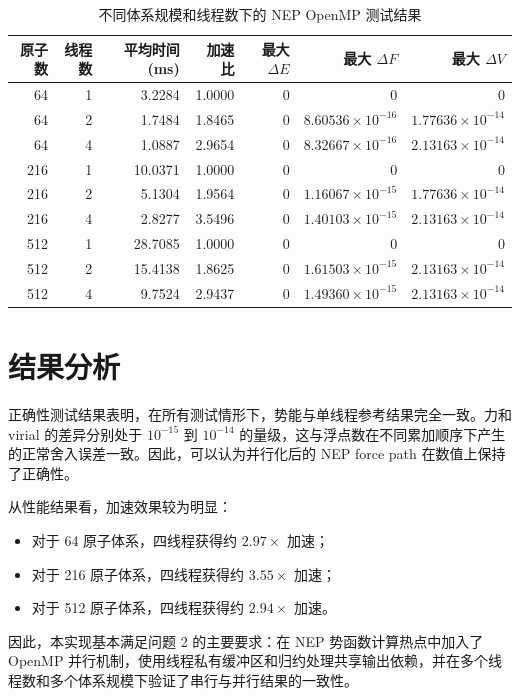 \documentclass[11pt]{article}
\begin{document}
\begin{table}[h]
\centering
\begin{tabular}{@{}rrrrrrr@{}}
\toprule
原子数 & 线程数 & 平均时间 (ms) & 加速比 & 最大 $\Delta E$ & 最大 $\Delta F$ & 最大 $\Delta V$ \\
\midrule
64  & 1 & 3.2284  & 1.0000 & 0 & 0 & 0 \\
64  & 2 & 1.7484  & 1.8465 & 0 & $8.60536\times10^{-16}$ & $1.77636\times10^{-14}$ \\
64  & 4 & 1.0887  & 2.9654 & 0 & $8.32667\times10^{-16}$ & $2.13163\times10^{-14}$ \\
216 & 1 & 10.0371 & 1.0000 & 0 & 0 & 0 \\
216 & 2 & 5.1304  & 1.9564 & 0 & $1.16067\times10^{-15}$ & $1.77636\times10^{-14}$ \\
216 & 4 & 2.8277  & 3.5496 & 0 & $1.40103\times10^{-15}$ & $2.13163\times10^{-14}$ \\
512 & 1 & 28.7085 & 1.0000 & 0 & 0 & 0 \\
512 & 2 & 15.4138 & 1.8625 & 0 & $1.61503\times10^{-15}$ & $2.13163\times10^{-14}$ \\
512 & 4 & 9.7524  & 2.9437 & 0 & $1.49360\times10^{-15}$ & $2.13163\times10^{-14}$ \\
\bottomrule
\end{tabular}
\caption{不同体系规模和线程数下的 NEP OpenMP 测试结果}
\end{table}

\section{结果分析}

正确性测试结果表明，在所有测试情形下，势能与单线程参考结果完全一致。力和 virial 的差异分别处于 \(10^{-15}\) 到 \(10^{-14}\) 的量级，这与浮点数在不同累加顺序下产生的正常舍入误差一致。因此，可以认为并行化后的 NEP force path 在数值上保持了正确性。

从性能结果看，加速效果较为明显：

\begin{itemize}
  \item 对于 64 原子体系，四线程获得约 \(2.97\times\) 加速；
  \item 对于 216 原子体系，四线程获得约 \(3.55\times\) 加速；
  \item 对于 512 原子体系，四线程获得约 \(2.94\times\) 加速。
\end{itemize}

因此，本实现基本满足问题 2 的主要要求：在 NEP 势函数计算热点中加入了 OpenMP 并行机制，使用线程私有缓冲区和归约处理共享输出依赖，并在多个线程数和多个体系规模下验证了串行与并行结果的一致性。
\end{document}
